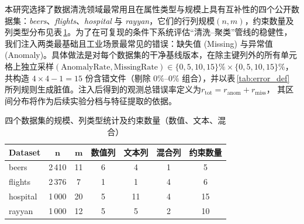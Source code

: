 \documentclass[10pt]{article} %
\numberwithin{equation}{section}
\begin{document}
\textcolor[rgb]{0.00,0.07,1.00}{本研究选择了数据清洗领域最常用且在属性类型与规模上具有互补性的四个公开数据集：\emph{beers}、\emph{flights}、\emph{hospital} 与 \emph{rayyan}，它们的行列规模\((n,m)\)，约束数量及列类型分布见表 \ref{tab:dataset_overview}。为了在可复现的条件下系统评估“清洗–聚类”管线的稳健性，我们注入两类最基础且工业场景最常见的错误：缺失值 (Missing) 与异常值 (Anomaly)。具体做法是对每个数据集的干净基线版本，在除主键列外的所有单元格上独立采样\((\text{AnomalyRate},
\text{MissingRate})\in\{0,5,10,15\}\%\times\{0,5,10,15\}\%\)，
共构造 \(4\times4-1=15\) 份含错文件（剔除 \(0\%–0\%\) 组合），并以表 \ref{tab:error_def} 所列规则生成脏值。注入后得到的观测总错误率定义为\(r_{\text{tot}}=r_{\text{anom}}+r_{\text{miss}}\)，
其区间分布将作为后续实验分档与特征提取的依据。}
\begin{table}[htbp]
  \centering
  \setlength{\tabcolsep}{5pt}
  \begin{tabular}{lcccccc}
    \toprule
    \textbf{Dataset} & $\boldsymbol{n}$ & $\boldsymbol{m}$ & \textbf{数值列} & \textbf{文本列} & \textbf{混合列} & \textbf{约束数量}\\
    \midrule
    beers    & 2\,410 & 11 & 6 & 4 & 1 & 5 \\
    flights  & 2\,376 & 7  & 1 & 1 & 4 & 6 \\
    hospital & 1\,000 & 20 & 5 & 11 & 4 & 15 \\
    rayyan   & 1\,000 & 12 & 5 & 5 & 2 & 10 \\
    \bottomrule
  \end{tabular}
  \caption{四个数据集的规模、列类型统计及约束数量（数值、文本、混合）}
  \label{tab:dataset_overview}
\end{table}
\end{document}
